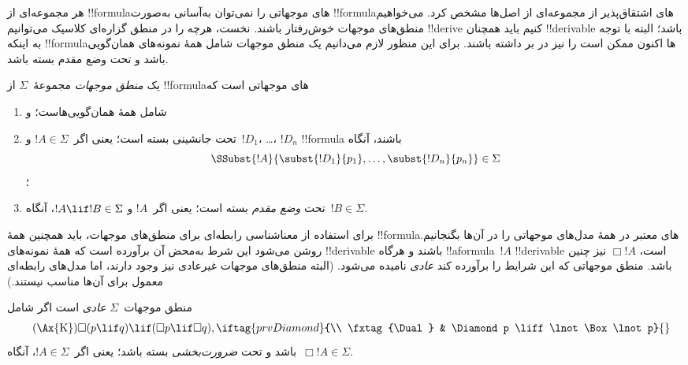 \documentclass[../../../include/open-logic-section]{subfiles}
\begin{document}


هر مجموعه‌ای از !!{formula}های موجهاتی را نمی‌توان به‌آسانی به‌صورت
!!{formula}های اشتقاق‌پذیر از مجموعه‌ای از اصل‌ها مشخص کرد. می‌خواهیم
منطق‌های موجهات خوش‌رفتار باشند. نخست، هرچه را در منطق گزاره‌ای کلاسیک
می‌توانیم !!{derive} کنیم باید همچنان !!{derivable} باشد؛ البته با توجه
به اینکه !!{formula}ها اکنون ممکن است
 را نیز در بر داشته باشند.
برای این منظور لازم می‌دانیم یک منطق موجهات شامل همهٔ نمونه‌های
همان‌گویی باشد و تحت وضع مقدم بسته باشد.

\begin{defn}
  یک \emph{منطق موجهات} مجموعهٔ~$\Sigma$ از !!{formula}های موجهاتی است
  که
  \begin{enumerate}
  \item شامل همهٔ همان‌گویی‌هاست؛ و
  \item تحت جانشینی بسته است؛ یعنی اگر~$!A \in \Sigma$ و~$!D_1$،
    \dots، $!D_n$ !!{formula} باشند، آنگاه
    \[
    \SSubst{!A}{\subst{!D_1}{p_1}, \dots, \subst{!D_n}{p_n}} \in \Sigma
    \]؛
  \item تحت \emph{وضع مقدم} بسته است؛ یعنی اگر~$!A$ و
    $!A \lif !B \in \Sigma$، آنگاه~$!B \in \Sigma$.
  \end{enumerate}
\end{defn}

برای استفاده از معناشناسی رابطه‌ای برای منطق‌های موجهات، باید همچنین
همهٔ !!{formula}های معتبر در همهٔ مدل‌های موجهاتی را در آن‌ها بگنجانیم.
روشن می‌شود این شرط به‌محض آن برآورده است که همهٔ نمونه‌های
 !!{derivable} باشند و هرگاه
!!a{formula}~$!A$ !!{derivable} است، $\Box !A$ نیز چنین باشد. منطق
موجهاتی که این شرایط را برآورده کند \emph{عادی} نامیده می‌شود. (البته
منطق‌های موجهات غیرعادی نیز وجود دارند، اما مدل‌های رابطه‌ای معمول برای
آن‌ها مناسب نیستند.)

\begin{defn}
  منطق موجهات~$\Sigma$ \emph{عادی} است اگر شامل
  \begin{align*}
    \tag{\Ax{K}} & \Box(p \lif q) \lif (\Box p \lif \Box q),
    \iftag{prvDiamond}{\\
      \tag{\Dual} & \Diamond p \liff \lnot\Box\lnot p}{}
  \end{align*}
  باشد و تحت \emph{ضرورت‌بخشی} بسته باشد؛ یعنی اگر~$!A \in \Sigma$،
  آنگاه~$\Box !A \in \Sigma$.
\end{defn}
\end{document}
